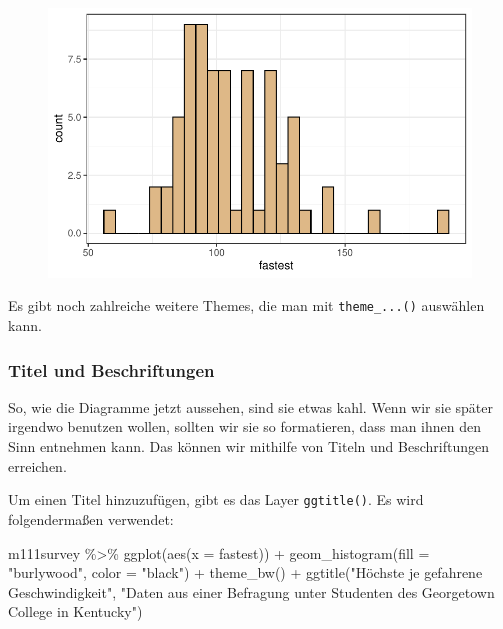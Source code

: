 \documentclass[
  letterpaper,
  DIV=11,
  numbers=noendperiod]{scrartcl}
\newenvironment{Shaded}{\begin{snugshade}}{\end{snugshade}}
\newcommand{\AttributeTok}[1]{\textcolor[rgb]{0.40,0.45,0.13}{#1}}
\newcommand{\FunctionTok}[1]{\textcolor[rgb]{0.28,0.35,0.67}{#1}}
\newcommand{\NormalTok}[1]{\textcolor[rgb]{0.00,0.23,0.31}{#1}}
\newcommand{\SpecialCharTok}[1]{\textcolor[rgb]{0.37,0.37,0.37}{#1}}
\newcommand{\StringTok}[1]{\textcolor[rgb]{0.13,0.47,0.30}{#1}}
\begin{document}
\begin{figure}[H]

{\centering \includegraphics{05-visualisierung_files/figure-pdf/unnamed-chunk-10-1.pdf}

}

\end{figure}

Es gibt noch zahlreiche weitere Themes, die man mit
\texttt{theme\_...()} auswählen kann.

\hypertarget{titel-und-beschriftungen}{%
\subsubsection{Titel und
Beschriftungen}\label{titel-und-beschriftungen}}

So, wie die Diagramme jetzt aussehen, sind sie etwas kahl. Wenn wir sie
später irgendwo benutzen wollen, sollten wir sie so formatieren, dass
man ihnen den Sinn entnehmen kann. Das können wir mithilfe von Titeln
und Beschriftungen erreichen.

Um einen Titel hinzuzufügen, gibt es das Layer \texttt{ggtitle()}. Es
wird folgendermaßen verwendet:

\begin{Shaded}
\begin{Highlighting}[]
\NormalTok{m111survey }\SpecialCharTok{\%\textgreater{}\%} 
  \FunctionTok{ggplot}\NormalTok{(}\FunctionTok{aes}\NormalTok{(}\AttributeTok{x =}\NormalTok{ fastest)) }\SpecialCharTok{+}
  \FunctionTok{geom\_histogram}\NormalTok{(}\AttributeTok{fill =} \StringTok{"burlywood"}\NormalTok{, }\AttributeTok{color =} \StringTok{"black"}\NormalTok{) }\SpecialCharTok{+}
  \FunctionTok{theme\_bw}\NormalTok{() }\SpecialCharTok{+}
  \FunctionTok{ggtitle}\NormalTok{(}\StringTok{"Höchste je gefahrene Geschwindigkeit"}\NormalTok{,}
          \StringTok{"Daten aus einer Befragung unter Studenten des Georgetown College in Kentucky"}\NormalTok{)}
\end{Highlighting}
\end{Shaded}
\end{document}
